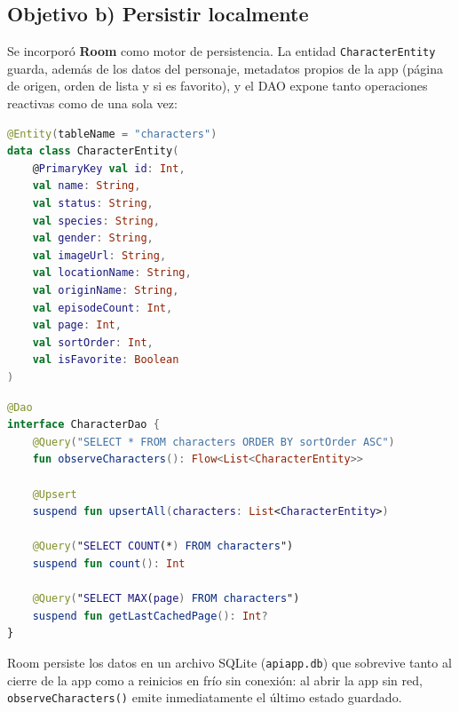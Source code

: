 \documentclass{article}
\begin{document}
	\subsection{Objetivo b) Persistir localmente}
	Se incorporó \textbf{Room} como motor de persistencia. La entidad \texttt{CharacterEntity} guarda, además de los datos del personaje, metadatos propios de la app (página de origen, orden de lista y si es favorito), y el DAO expone tanto operaciones reactivas como de una sola vez:
	\begin{lstlisting}[language=Kotlin,caption={CharacterEntity.kt}]
@Entity(tableName = "characters")
data class CharacterEntity(
    @PrimaryKey val id: Int,
    val name: String,
    val status: String,
    val species: String,
    val gender: String,
    val imageUrl: String,
    val locationName: String,
    val originName: String,
    val episodeCount: Int,
    val page: Int,
    val sortOrder: Int,
    val isFavorite: Boolean
)
	\end{lstlisting}
	\begin{lstlisting}[language=Kotlin,caption={CharacterDao.kt}]
@Dao
interface CharacterDao {
    @Query("SELECT * FROM characters ORDER BY sortOrder ASC")
    fun observeCharacters(): Flow<List<CharacterEntity>>

    @Upsert
    suspend fun upsertAll(characters: List<CharacterEntity>)

    @Query("SELECT COUNT(*) FROM characters")
    suspend fun count(): Int

    @Query("SELECT MAX(page) FROM characters")
    suspend fun getLastCachedPage(): Int?
}
	\end{lstlisting}
	Room persiste los datos en un archivo SQLite (\texttt{apiapp.db}) que sobrevive tanto al cierre de la app como a reinicios en frío sin conexión: al abrir la app sin red, \texttt{observeCharacters()} emite inmediatamente el último estado guardado.
\end{document}
